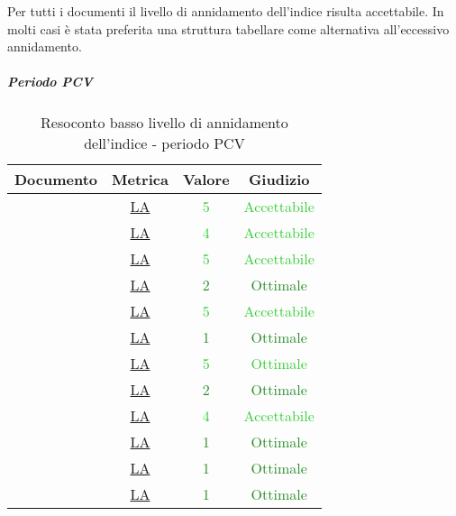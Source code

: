 					Per tutti i documenti il livello di annidamento dell'indice risulta accettabile. In molti casi è stata preferita una struttura tabellare come alternativa all'eccessivo annidamento.
					\subparagraph{Periodo PCV}
						\begin{table}[H]
						\centering
						\small
						\begin{tabular}{c | c | c | c}
							\hline
							\textbf{Documento} & \textbf{Metrica} & \textbf{Valore} & \textbf{Giudizio} \\
							\hline
							\pdpvtre        & \hyperref[MLEC]{LA} & \textcolor{LimeGreen}{5} & \textcolor{LimeGreen}{Accettabile} \\
							\pdqvtre        & \hyperref[MLEC]{LA} & \textcolor{LimeGreen}{4} & \textcolor{LimeGreen}{Accettabile} \\
							\ndpvtre        & \hyperref[MLEC]{LA} & \textcolor{LimeGreen}{5} & \textcolor{LimeGreen}{Accettabile} \\
							\adrvtre        & \hyperref[MLEC]{LA}& \textcolor{ForestGreen}{2} & \textcolor{ForestGreen}{Ottimale} \\
							\stvdue		& \hyperref[MLEC]{LA} & \textcolor{LimeGreen}{5} & \textcolor{LimeGreen}{Accettabile} \\
							\glvdue        & \hyperref[MLEC]{LA} & \textcolor{ForestGreen}{1} & \textcolor{ForestGreen}{Ottimale} \\
							\ddpvuno        & \hyperref[MLEC]{LA}  & \textcolor{LimeGreen}{5} & \textcolor{LimeGreen}{Ottimale} \\
							\manutvuno        & \hyperref[MLEC]{LA}  & \textcolor{ForestGreen}{2} & \textcolor{ForestGreen}{Ottimale} \\
							\manmanvuno        & \hyperref[MLEC]{LA}  & \textcolor{LimeGreen}{4} & \textcolor{LimeGreen}{Accettabile} \\
							\vsesettei       & \hyperref[MLEC]{LA} & \textcolor{ForestGreen}{1} & \textcolor{ForestGreen}{Ottimale} \\
							\vottoi       & \hyperref[MLEC]{LA}  & \textcolor{ForestGreen}{1} & \textcolor{ForestGreen}{Ottimale} \\
							\vquattroe       & \hyperref[MLEC]{LA} & \textcolor{ForestGreen}{1} & \textcolor{ForestGreen}{Ottimale} \\
						\end{tabular}
						\caption{Resoconto basso livello di annidamento dell'indice - periodo PCV}
						\label{tab_resoconto_basso_livello_di_annidamento_indice_PPCV}
					\end{table}
					
